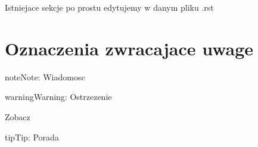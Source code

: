 \documentclass[letterpaper,10pt,english]{sphinxmanual}
\begin{document}
\begin{sphinxVerbatim}[commandchars=\\\{\}]
 
   
    

         
            
\end{sphinxVerbatim}

Istniejace sekcje po prostu edytujemy w danym pliku .rst


\section{Oznaczenia zwracajace uwage}
\label{\detokenize{tutorial:oznaczenia-zwracajace-uwage}}
\begin{sphinxVerbatim}[commandchars=\\\{\}]
  

  

  

  

  

  
\end{sphinxVerbatim}

\begin{sphinxadmonition}{note}{Note:}
Wiadomosc
\end{sphinxadmonition}

\begin{sphinxadmonition}{warning}{Warning:}
Ostrzezenie
\end{sphinxadmonition}




Zobacz



\begin{sphinxadmonition}{tip}{Tip:}
Porada
\end{sphinxadmonition}
\end{document}
